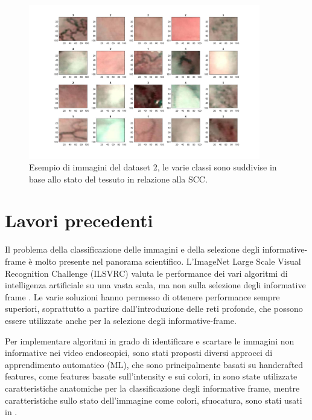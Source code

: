 \begin{figure}[ht]
    \centering
    \includegraphics[width=0.9\textwidth]{introduzione/dataset-2-ml.JPG}
    \caption[Esempio di immagini del dataset 2]{Esempio di immagini del dataset 2, le varie classi sono suddivise in base allo stato del tessuto in relazione alla SCC.}
    \label{fig:dataset2ml}
\end{figure}

\section{Lavori precedenti}\label{lavori-precedenti}

Il problema  della classificazione delle immagini e della selezione degli informative-frame è molto presente nel panorama scientifico. L'ImageNet Large Scale Visual Recognition Challenge (ILSVRC) valuta le performance dei vari algoritmi di intelligenza artificiale su una vasta scala, ma non sulla selezione degli informative frame \cite{imagenet}. Le varie soluzioni hanno permesso di ottenere performance sempre superiori, soprattutto a partire dall'introduzione delle reti profonde, che possono essere utilizzate anche per la selezione degli informative-frame.

Per implementare algoritmi in grado di identificare e scartare le immagini non informative nei video endoscopici, sono stati proposti diversi approcci di apprendimento automatico (ML), che sono principalmente basati su handcrafted features, come features basate sull'intensity e sui colori, in \citeauthor{zhang_colon} \cite{zhang_colon} sono state utilizzate caratteristiche anatomiche per la classificazione degli informative frame, mentre caratteristiche sullo stato dell'immagine come colori, sfuocatura, sono stati usati in \citeauthor{armin_colonscopy} \cite{armin_colonscopy}. 

